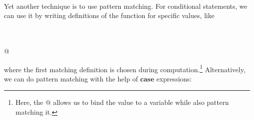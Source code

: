 \documentclass[paper=A4,twoside=true,openright,parskip=full,chapterprefix=true,headings=normal,bibliography=totoc,listof=totoc,titlepage=on,captions=tableabove,draft=false,british]{scrreprt}%
\begin{document}
\begin{hscode}\SaveRestoreHook
{}%
%
%
\>[B]{}\mathbin{::}\to {}\<[E]%
\\
\>[B]{}\;\<[E]%
\\
\>[B]{}\<[5]%
\>[5]{}\mid {}\mathbin{<}\mathrel{=}\mathbin{*}\<[E]%
\\
\>[B]{}\<[5]%
\>[5]{}\mid {}\mathbin{<}\mathrel{=}\mathbin{*}\<[E]%
\\
\>[B]{}\<[5]%
\>[5]{}\mid {}\mathbin{<}\mathrel{=}\<[E]%
\\
\>[B]{}\<[5]%
\>[5]{}\mid {}\mathbin{>}\mathrel{\wedge}\mathbin{<}\mathrel{=}\<[E]%
\\
\>[B]{}\<[5]%
\>[5]{}\mid {}\mathrel{=}\mathbin{*}\<[E]%
\ColumnHook
\end{hscode}\resethooks
\vspace{-2\baselineskip}

Yet another technique is to use pattern matching. For conditional
statements, we can use it by writing definitions of the function for
specific values, like


\begin{hscode}\SaveRestoreHook
{}%
%
\>[B]{}\mathbin{::}\to {}\<[E]%
\\
\>[B]{}\;\mathrel{=}\<[E]%
\\
\>[B]{}\;\;@\;\mathrel{=}\mathbin{*}\<[E]%
\\
\>[B]{}\;\mathrel{=}\mathbin{*}\<[E]%
\ColumnHook
\end{hscode}\resethooks
\vspace{-2\baselineskip}

where the first matching definition is chosen during
computation.\footnote{Here, the \ensuremath{@} allows us to bind the value to
  a variable while also pattern matching it.} Alternatively, we can do
pattern matching with the help of \ensuremath{\mathbf{case}} expressions:
\end{document}
